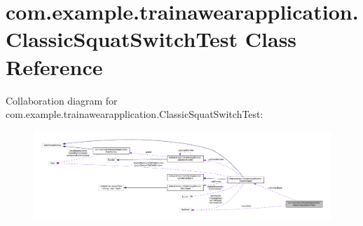 \hypertarget{classcom_1_1example_1_1trainawearapplication_1_1_classic_squat_switch_test}{}\section{com.\+example.\+trainawearapplication.\+Classic\+Squat\+Switch\+Test Class Reference}
\label{classcom_1_1example_1_1trainawearapplication_1_1_classic_squat_switch_test}


Collaboration diagram for com.\+example.\+trainawearapplication.\+Classic\+Squat\+Switch\+Test\+:
\nopagebreak
\begin{figure}[H]
\begin{center}
\leavevmode
\includegraphics[width=350pt]{classcom_1_1example_1_1trainawearapplication_1_1_classic_squat_switch_test__coll__graph}
\end{center}
\end{figure}
